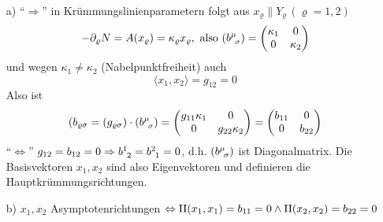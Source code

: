 \begin{beweis} \(\)
 \begin{enumerate}
  \item[a)] "`\(\Rightarrow\)"' in Krümmungslinienparametern folgt aus \(x_\varrho \parallel Y_\varrho \, (\varrho = 1,2)\)
  \[
   - \partial_\varrho N = A(x_\varrho) = \kappa_\varrho x_\varrho, \text{ also } (b^{\mu}_{\;\, \sigma}) = \begin{pmatrix}
                                                                                                       \kappa_1 & 0 \\
                                                                                                       0 & \kappa_2
                                                                                                      \end{pmatrix}
  \]
  und wegen \(\kappa_1 \ne \kappa_2\) (Nabelpunktfreiheit) auch
  \[
   \langle x_1, x_2 \rangle = g_{12} = 0
  \]
  Also ist 
  \[
   (b_{\varrho \sigma} = (g_{\varrho \sigma}) \cdot (b^{\mu}_{\;\, \sigma}) = \begin{pmatrix}
                                                                          g_{11} \kappa_1 & 0 \\
                                                                          0 & g_{22} \kappa_2
                                                                         \end{pmatrix}
                                                                         = \begin{pmatrix}
                                                                            b_{11} & 0 \\
                                                                            0 & b_{22}
                                                                           \end{pmatrix}
  \]
  "`\(\Leftrightarrow\)"' \(g_{12} = b_{12} = 0 \Rightarrow b^{1}_{\;\, 2} = b^{2}_{\;\, 1} = 0\), d.h. \((b^{\mu}_{\;\, \sigma})\) ist Diagonalmatrix. Die Basisvektoren \(x_1, x_2\) sind also Eigenvektoren und definieren die Hauptkrümmungsrichtungen.
  \item[b)]
  \(x_1, x_2\) Asymptotenrichtungen \(\Leftrightarrow \Rom2 (x_1, x_1) = b_{11} = 0 \land \Rom2 (x_2, x_2) = b_{22} = 0\)
 \end{enumerate}

\end{beweis}

